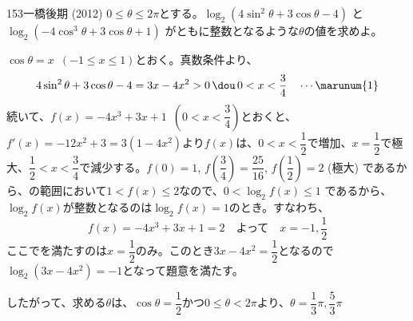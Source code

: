 \begin{thm}{153}{\maru}{一橋後期 (2012)}
 $0\le\theta\le 2\pi$とする。$\log_2 (4\sin^2\theta+3\cos\theta-4)$ と $\log_2 (-4\cos^3\theta+3\cos\theta+1)$ がともに整数となるような$\theta$の値を求めよ。
\end{thm}

$\cos\theta=x$~$(-1\le x\le 1)$とおく。真数条件より、
\[ 4\sin^2\theta+3\cos\theta-4=3x-4x^2 > 0 \,\dou\, 0<x<\frac{3}{4} \quad \cdots \marunum{1} \]
続いて、$f(x)=-4x^3+3x+1$~$(0<x<\dfrac{3}{4})$とおくと、$f'(x)=-12x^2+3=3(1-4x^2)$より$f(x)$は、$0<x<\dfrac{1}{2}$で増加、$x=\dfrac{1}{2}$で極大、$\dfrac{1}{2}<x<\dfrac{3}{4}$で減少する。$f(0)=1$, $f\left(\dfrac{3}{4}\right)=\dfrac{25}{16}$, $f\left(\dfrac{1}{2}\right)=2$ (極大) であるから、の範囲において$1<f(x)\le 2$なので、$0<\log_2{f(x)}\le 1$ であるから、$\log_2{f(x)}$が整数となるのは$\log_2{f(x)}=1$のとき。すなわち、
\[ f(x)=-4x^3+3x+1=2 \quad  \text{よって}\quad x=-1, \frac{1}{2} \]
ここでを満たすのは$x=\dfrac{1}{2}$のみ。このとき$3x-4x^2=\dfrac{1}{2}$となるので$\log_2{(3x-4x^2)}=-1$となって題意を満たす。

したがって、求める$\theta$は、$\cos\theta=\dfrac{1}{2}$かつ$0\le \theta < 2\pi$より、$\theta=\dfrac{1}{3}\pi, \dfrac{5}{3}\pi$